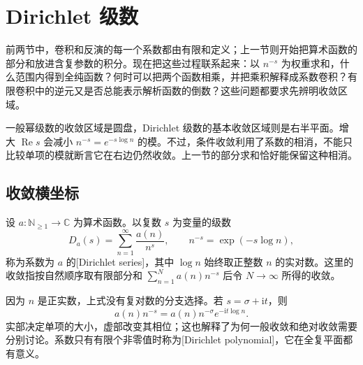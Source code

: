 \section{Dirichlet 级数}
\label{b3:sec:2504}

前两节中，卷积和反演的每一个系数都由有限和定义；上一节则开始把算术函数的部分和放进含复参数的积分。现在把这些过程联系起来：以 \(n^{-s}\) 为权重求和，什么范围内得到全纯函数？何时可以把两个函数相乘，并把乘积解释成系数卷积？有限卷积中的逆元又是否总能表示解析函数的倒数？这些问题都要求先辨明收敛区域。

一般幂级数的收敛区域是圆盘，Dirichlet 级数的基本收敛区域则是右半平面。增大 \(\operatorname{Re}s\) 会减小 \(n^{-s}=e^{-s\log n}\) 的模。不过，条件收敛利用了系数的相消，不能只比较单项的模就断言它在右边仍然收敛。上一节的部分求和恰好能保留这种相消。

\subsection{收敛横坐标}
\label{b3:subsec:250401}

\begin{definition}[Dirichlet 级数]\label{b3:def:25-dirichlet-series}
设 \(a:\mathbb N_{\ge1}\to\mathbb C\) 为算术函数。以复数 \(s\) 为变量的级数
\[
 D_a(s)=\sum_{n=1}^{\infty}\frac{a(n)}{n^s},
 \qquad n^{-s}=\exp(-s\log n),
\]
称为系数为 \(a\) 的[Dirichlet series]，其中 \(\log n\) 始终取正整数 \(n\) 的实对数。这里的收敛指按自然顺序取有限部分和 \(\sum_{n=1}^N a(n)n^{-s}\) 后令 \(N\to\infty\) 所得的收敛。
\end{definition}

因为 \(n\) 是正实数，上式没有复对数的分支选择。若 \(s=\sigma+\mathrm it\)，则
\[
 a(n)n^{-s}=a(n)n^{-\sigma}e^{-\mathrm it\log n}.
\]
实部决定单项的大小，虚部改变其相位；这也解释了为何一般收敛和绝对收敛需要分别讨论。系数只有有限个非零值时称为[Dirichlet polynomial]，它在全复平面都有意义。

